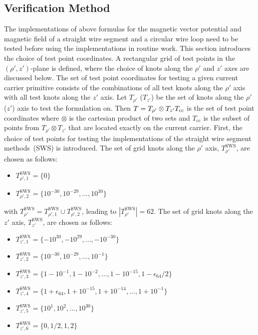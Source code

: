 \subsection{Verification Method}
\label{sec:methods_verification}
The implementations of above formulas for the magnetic vector potential
and magnetic field of a straight wire segment and a circular wire loop
need to be tested before using the implementations in routine work.
This section introduces the choice of test point coordinates.
A rectangular grid of test points in the $(\rho', z')$-plane is defined,
where the choice of knots along the $\rho'$ and $z'$ axes are discussed below.
The set of test point coordinates for testing a given current carrier primitive
consists of the combinations of all test knots along the $\rho'$ axis
with all test knots along the $z'$ axis.
Let $T_{\rho'}$ ($T_{z'}$) be the set of knots along the $\rho'$ ($z'$) axis to test the formulation on.
Then $T = T_{\rho'} \otimes T_{z'} \\ T_\mathrm{cc}$ is the set of test point coordinates
where $\otimes$ is the cartesian product of two sets
and $T_\mathrm{cc}$ is the subset of points from $T_{\rho'} \otimes T_{z'}$ that are located exactly on the current carrier.
First, the choice of test points for testing the implementations
of the straight wire segment methods~(SWS) is introduced.
The set of grid knots along the $\rho'$ axis, $T^\mathrm{SWS}_{\rho'}$, are chosen as follows:
\begin{itemize}
  \item $T^\mathrm{SWS}_{\rho',1} = \{ 0 \}$
  \item $T^\mathrm{SWS}_{\rho',2} = \{ 10^{-30}, 10^{-29}, ..., 10^{30} \}$
\end{itemize}
with $T^\mathrm{SWS}_{\rho'} = T^\mathrm{SWS}_{\rho',1} \cup T^\mathrm{SWS}_{\rho',2}$,
leading to $|T^\mathrm{SWS}_{\rho'}| = 62$.
The set of grid knots along the $z'$ axis, $T^\mathrm{SWS}_{z'}$, are chosen as follows:
\begin{itemize}
  \item $T^\mathrm{SWS}_{z',1} = \{ -10^{30}, -10^{29}, ..., -10^{-30} \}$
  \item $T^\mathrm{SWS}_{z',2} = \{ 10^{-30}, 10^{-29}, ..., 10^{-1} \}$
  \item $T^\mathrm{SWS}_{z',3} = \{ 1 - 10^{-1}, 1 - 10^{-2}, ..., 1 - 10^{-15}, 1 - \epsilon_{64}/2 \}$
  \item $T^\mathrm{SWS}_{z',4} = \{ 1 + \epsilon_{64}, 1 + 10^{-15}, 1 + 10^{-14}, ..., 1 + 10^{-1} \}$
  \item $T^\mathrm{SWS}_{z',5} = \{ 10^{1}, 10^{2}, ..., 10^{30} \}$
  \item $T^\mathrm{SWS}_{z',6} = \{ 0, 1/2, 1, 2 \}$
\end{itemize}
